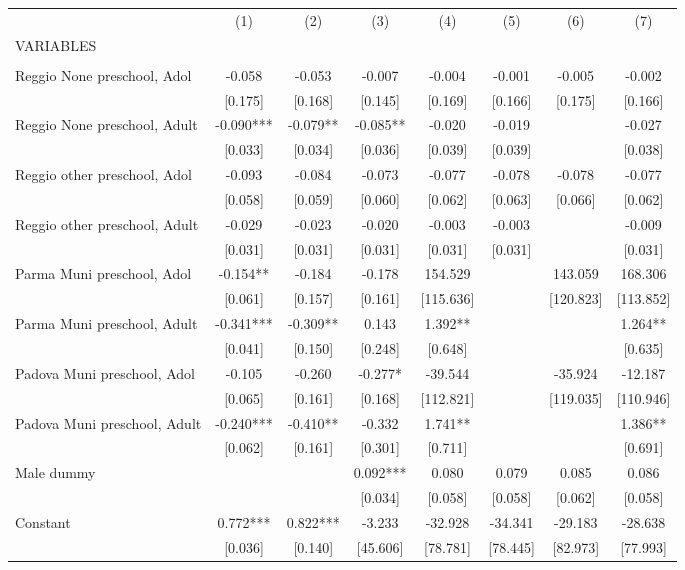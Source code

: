 \begin{tabular}{lccccccc} \hline
 & (1) & (2) & (3) & (4) & (5) & (6) & (7) \\
VARIABLES &  &  &  &  &  &  &  \\ \hline
 &  &  &  &  &  &  &  \\
Reggio None preschool, Adol & -0.058 & -0.053 & -0.007 & -0.004 & -0.001 & -0.005 & -0.002 \\
 & [0.175] & [0.168] & [0.145] & [0.169] & [0.166] & [0.175] & [0.166] \\
Reggio None preschool, Adult & -0.090*** & -0.079** & -0.085** & -0.020 & -0.019 &  & -0.027 \\
 & [0.033] & [0.034] & [0.036] & [0.039] & [0.039] &  & [0.038] \\
Reggio other preschool, Adol & -0.093 & -0.084 & -0.073 & -0.077 & -0.078 & -0.078 & -0.077 \\
 & [0.058] & [0.059] & [0.060] & [0.062] & [0.063] & [0.066] & [0.062] \\
Reggio other preschool, Adult & -0.029 & -0.023 & -0.020 & -0.003 & -0.003 &  & -0.009 \\
 & [0.031] & [0.031] & [0.031] & [0.031] & [0.031] &  & [0.031] \\
Parma Muni preschool, Adol & -0.154** & -0.184 & -0.178 & 154.529 &  & 143.059 & 168.306 \\
 & [0.061] & [0.157] & [0.161] & [115.636] &  & [120.823] & [113.852] \\
Parma Muni preschool, Adult & -0.341*** & -0.309** & 0.143 & 1.392** &  &  & 1.264** \\
 & [0.041] & [0.150] & [0.248] & [0.648] &  &  & [0.635] \\
Padova Muni preschool, Adol & -0.105 & -0.260 & -0.277* & -39.544 &  & -35.924 & -12.187 \\
 & [0.065] & [0.161] & [0.168] & [112.821] &  & [119.035] & [110.946] \\
Padova Muni preschool, Adult & -0.240*** & -0.410** & -0.332 & 1.741** &  &  & 1.386** \\
 & [0.062] & [0.161] & [0.301] & [0.711] &  &  & [0.691] \\
Male dummy &  &  & 0.092*** & 0.080 & 0.079 & 0.085 & 0.086 \\
 &  &  & [0.034] & [0.058] & [0.058] & [0.062] & [0.058] \\
Constant & 0.772*** & 0.822*** & -3.233 & -32.928 & -34.341 & -29.183 & -28.638 \\
 & [0.036] & [0.140] & [45.606] & [78.781] & [78.445] & [82.973] & [77.993] \\

\end{tabular}
